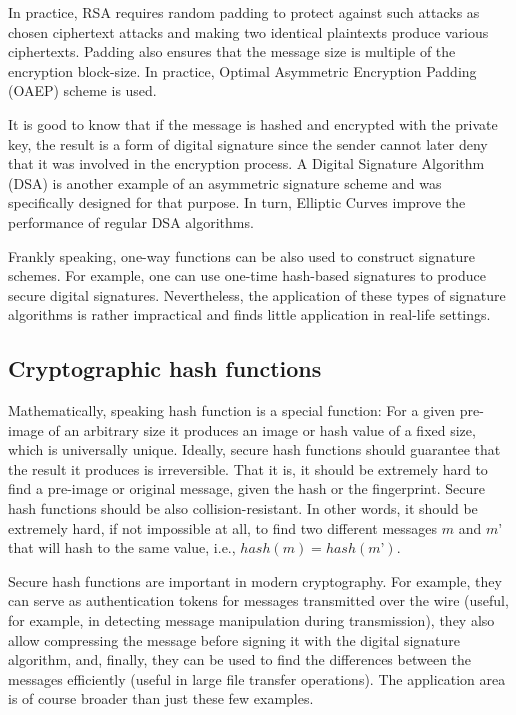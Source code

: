 In practice, RSA requires random padding to protect against such attacks as chosen ciphertext 
attacks and making two identical plaintexts produce various ciphertexts. Padding also ensures that the 
message size is multiple of the encryption block-size. In practice, Optimal Asymmetric Encryption Padding (OAEP) 
scheme is used.

It is good to know that if the message is hashed and encrypted with the private key, the result is a 
form of digital signature since the sender cannot later deny that it was involved in the encryption 
process. A Digital Signature Algorithm (DSA) is another example of an asymmetric signature scheme and 
was specifically designed for that purpose. In turn, Elliptic Curves improve the performance of regular DSA 
algorithms.

Frankly speaking, one-way functions can be also used to construct signature schemes. 
For example, one can use one-time hash-based signatures to produce secure digital signatures. Nevertheless, 
the application of these types of signature algorithms is rather impractical and finds 
little application in real-life settings.

\subsection{Cryptographic hash functions}

Mathematically, speaking hash function is a special function: For a given  
pre-image of an arbitrary size it produces an image or hash value of a fixed size, 
which is universally unique. Ideally, secure hash functions should guarantee 
that the result it produces is irreversible. That it is, it 
should be extremely hard to find a pre-image or original message, given the 
hash or the fingerprint. Secure hash functions should be also collision-resistant. 
In other words, it should be extremely hard, if not impossible at all, to 
find two different messages $m$ and $m’$ that will hash to the same value, i.e., 
$hash(m)=hash(m’)$.

Secure hash functions are important in modern cryptography. 
For example, they can serve as authentication tokens for messages transmitted over the 
wire (useful, for example, in detecting message manipulation during transmission), 
they also allow compressing the message before signing it with the digital signature 
algorithm, and, finally, they can be used to find the differences between the messages 
efficiently (useful in large file transfer operations). The application area is of 
course broader than just these few examples. 

